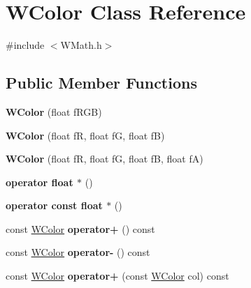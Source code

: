 \hypertarget{class_w_color}{}\section{W\+Color Class Reference}
\label{class_w_color}


{\ttfamily \#include $<$W\+Math.\+h$>$}

\subsection*{Public Member Functions}
\begin{DoxyCompactItemize}
\item 
{\bfseries W\+Color} (float f\+R\+GB)\hypertarget{class_w_color_a5dc0ff89bb900ca42dd8451152296932}{}\label{class_w_color_a5dc0ff89bb900ca42dd8451152296932}

\item 
{\bfseries W\+Color} (float fR, float fG, float fB)\hypertarget{class_w_color_a27b443eb5f19c2c58fb32bfe55503770}{}\label{class_w_color_a27b443eb5f19c2c58fb32bfe55503770}

\item 
{\bfseries W\+Color} (float fR, float fG, float fB, float fA)\hypertarget{class_w_color_a16123034ea200d0c251e10e900e612cf}{}\label{class_w_color_a16123034ea200d0c251e10e900e612cf}

\item 
{\bfseries operator float $\ast$} ()\hypertarget{class_w_color_a0b06e9dfce8e662baa203552d341145c}{}\label{class_w_color_a0b06e9dfce8e662baa203552d341145c}

\item 
{\bfseries operator const float $\ast$} ()\hypertarget{class_w_color_ab0953e49390ec00766c60733713d0de4}{}\label{class_w_color_ab0953e49390ec00766c60733713d0de4}

\item 
const \hyperlink{class_w_color}{W\+Color} {\bfseries operator+} () const \hypertarget{class_w_color_a0a12901a5c1aaf8989648d616aa555c3}{}\label{class_w_color_a0a12901a5c1aaf8989648d616aa555c3}

\item 
const \hyperlink{class_w_color}{W\+Color} {\bfseries operator-\/} () const \hypertarget{class_w_color_a7b1e53c97d5c7974a07eeef59fbb458c}{}\label{class_w_color_a7b1e53c97d5c7974a07eeef59fbb458c}

\item 
const \hyperlink{class_w_color}{W\+Color} {\bfseries operator+} (const \hyperlink{class_w_color}{W\+Color} col) const \hypertarget{class_w_color_adaa18f12f3a7316beded3e040c936d96}{}\label{class_w_color_adaa18f12f3a7316beded3e040c936d96}


\end{DoxyCompactItemize}
